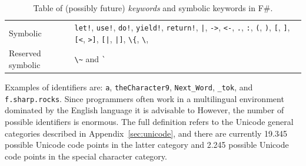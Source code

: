 \documentclass[fsharpNotes.tex]{subfiles}
\begin{document}
\begin{table}
\begin{tabularx}{\textwidth}{|l|>{\raggedright\arraybackslash}X|}
 Symbolic
 & \mbox{\lstinline{let!},} \mbox{\lstinline{use!},} \mbox{\lstinline{do!},} \mbox{\lstinline{yield!},} \mbox{\lstinline{return!},} \mbox{\lstinline{|},} \mbox{\lstinline{->},} \mbox{\lstinline{<-},} \mbox{\lstinline{.},} \mbox{\lstinline{:},} \mbox{\lstinline{(},} \mbox{\lstinline{)},} \mbox{\lstinline{[},} \mbox{\lstinline{]},} \mbox{\lstinline{[<},} \mbox{\lstinline{>]},} \mbox{\lstinline{[|},} \mbox{\lstinline{|]},} \mbox{\lstinline{\{},} \mbox{\lstinline{\}},} \mbox{\lstinline{'},} \mbox{\lstinline{#},} \mbox{\lstinline{:?>},} \mbox{\lstinline{:?},} \mbox{\lstinline{:>},} \mbox{\lstinline{..},} \mbox{\lstinline{::},} \mbox{\lstinline{:=},} \mbox{\lstinline{;;},} \mbox{\lstinline{;},} \mbox{\lstinline{=},} \mbox{\lstinline{_},} \mbox{\lstinline{?},} \mbox{\lstinline{??},} \mbox{\lstinline{(*)},} \mbox{\lstinline{<@},} \mbox{\lstinline{@>},} \mbox{\lstinline{<@@},} and \mbox{\lstinline{@@>}.} \\
 Reserved symbolic
 &\mbox{\lstinline{\~}} and \mbox{\lstinline{`}}\\
    \hline
  \end{tabularx}
  \caption{Table of (possibly future) \emph{keywords} and symbolic keywords in F\#.}
  \label{tab:keywords}
\end{table}
Examples of identifiers are: \lstinline{a}, \lstinline{theCharacter9}, \lstinline{Next_Word}, \lstinline{_tok}, and \lstinline{f.sharp.rocks}.  Since programmers often work in a multilingual environment dominated by the English language it is advisable to   However, the number of possible identifiers is enormous. The full definition refers to the Unicode general categories described in Appendix~\ref{sec:unicode}, and there are currently 19.345 possible Unicode code points in the latter category and 2.245 possible Unicode code points in the special character category.
\end{document}
